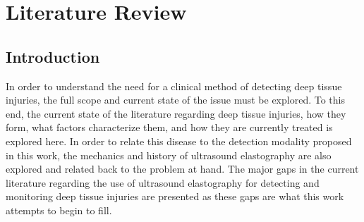 \chapter{Literature Review}
\label{chap:litreview}
	\section{Introduction}
		In order to understand the need for a clinical method of detecting deep tissue injuries, the full scope and current state of the issue must be explored. To this end, the current state of the literature regarding deep tissue injuries, how they form, what factors characterize them, and how they are currently treated is explored here. In order to relate this disease to the detection modality proposed in this work, the mechanics and history of ultrasound elastography are also explored and related back to the problem at hand. The major gaps in the current literature regarding the use of ultrasound elastography for detecting and monitoring deep tissue injuries are presented as these gaps are what this work attempts to begin to fill.

